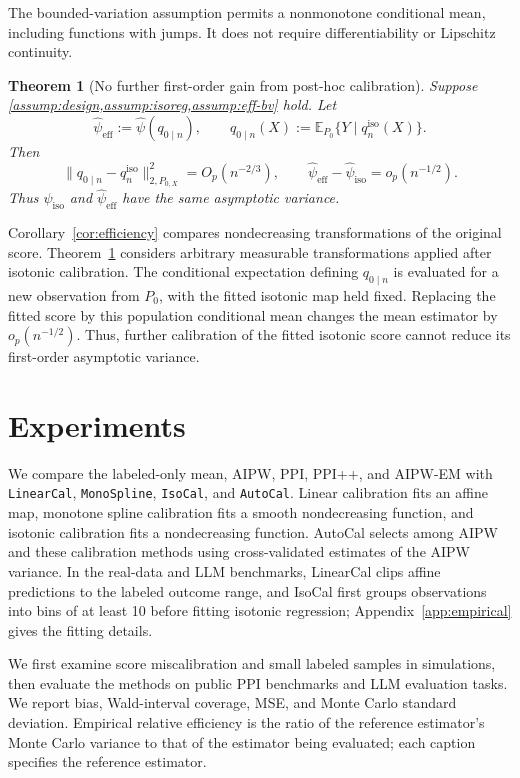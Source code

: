 \documentclass{article}
\theoremstyle{plain}
\newtheorem{theorem}{Theorem}
\theoremstyle{definition}
\newcommand{\E}{\mathbb{E}}
\newcommand{\1}{\mathbf{1}}
\newcommand{\Px}{P_{0,X}}
\begin{document}
The bounded-variation assumption permits a nonmonotone conditional mean,
including functions with jumps. It does not require differentiability or
Lipschitz continuity.

\begin{theorem}[No further first-order gain from post-hoc calibration]
\label{prop:eif-red}
Suppose \cref{assump:design,assump:isoreg,assump:eff-bv} hold. Let
\[
\widehat{\psi}_{\mathrm{eff}}
:=
\widehat{\psi}(q_{0\mid n}),
\qquad
q_{0\mid n}(X)
:=
\E_{P_0}\{Y \mid q_n^{\mathrm{iso}}(X)\}.
\]
Then
\[
\|q_{0\mid n}-q_n^{\mathrm{iso}}\|_{2,\Px}^2=O_p(n^{-2/3}),
\qquad
\widehat{\psi}_{\mathrm{eff}}-\widehat{\psi}_{\mathrm{iso}}
=
o_p(n^{-1/2}).
\]
Thus \(\widehat{\psi}_{\mathrm{iso}}\) and
\(\widehat{\psi}_{\mathrm{eff}}\) have the same asymptotic variance.
\end{theorem}

Corollary~\ref{cor:efficiency} compares nondecreasing transformations of the
original score. Theorem~\ref{prop:eif-red} considers arbitrary measurable
transformations applied after isotonic calibration. The conditional expectation
defining \(q_{0\mid n}\) is evaluated for a new observation from \(P_0\), with
the fitted isotonic map held fixed. Replacing the fitted score by this
population conditional mean changes the mean estimator by \(o_p(n^{-1/2})\).
Thus, further calibration of the fitted isotonic score cannot reduce its
first-order asymptotic variance.

\section{Experiments}
\label{sec:exp}

We compare the labeled-only mean, AIPW, PPI, PPI++, and \textsc{AIPW-EM}
with \texttt{LinearCal}, \texttt{MonoSpline}, \texttt{IsoCal}, and
\texttt{AutoCal}. Linear calibration fits an affine map, monotone spline
calibration fits a smooth nondecreasing function, and isotonic calibration
fits a nondecreasing function. AutoCal selects among AIPW and these
calibration methods using cross-validated estimates of the AIPW variance.
In the real-data and LLM benchmarks, LinearCal clips affine predictions to
the labeled outcome range, and IsoCal first groups observations into bins
of at least 10 before fitting isotonic regression; Appendix~\ref{app:empirical}
gives the fitting details.

We first examine score miscalibration and small labeled samples in
simulations, then evaluate the methods on public PPI benchmarks and LLM
evaluation tasks. We report bias, Wald-interval coverage, MSE, and Monte Carlo
standard deviation. Empirical relative efficiency is the ratio of the
reference estimator's Monte Carlo variance to that of the estimator being
evaluated; each caption specifies the reference estimator.
\end{document}
